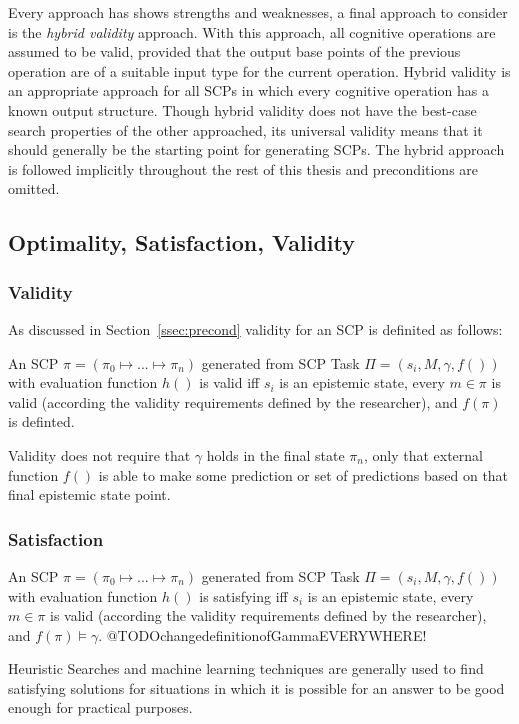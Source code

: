 Every approach has shows strengths and weaknesses, a final approach to consider is the \textit{hybrid validity} approach. With this approach, all cognitive operations are assumed to be valid, provided that the output base points of the previous operation are of a suitable input type for the current operation. Hybrid validity is an appropriate approach for all SCPs in which every cognitive operation has a known output structure. Though hybrid validity does not have the best-case search properties of the other approached, its universal validity means that it should generally be the starting point for generating SCPs. The hybrid approach is followed implicitly throughout the rest of this thesis and preconditions are omitted.

\subsection{Optimality, Satisfaction, Validity} \label{ssec:validity}
\subsubsection{Validity}
As discussed in Section~\ref{ssec:precond} validity for an SCP is definited as follows:

An SCP $\pi=(\pi_0 \longmapsto ... \longmapsto \pi_n)$ generated from SCP Task $\Pi=(s_i, M, \gamma, f())$ with evaluation function $h()$ is valid iff $s_i$ is an epistemic state, every $m \in \pi$ is valid (according the validity requirements defined by the researcher), and $f(\pi)$ is definted. 

Validity does not require that $\gamma$ holds in the final state $\pi_n$, only that external function $f()$ is able to make some prediction or set of predictions based on that final epistemic state point.


\subsubsection{Satisfaction} 

An SCP $\pi=(\pi_0 \longmapsto ... \longmapsto \pi_n)$ generated from SCP Task $\Pi=(s_i, M, \gamma, f())$ with evaluation function $h()$ is satisfying iff $s_i$ is an epistemic state, every $m \in \pi$ is valid (according the validity requirements defined by the researcher), and $f(\pi)\models \gamma$. @TODOchangedefinitionofGammaEVERYWHERE!

Heuristic Searches and machine learning techniques are generally used to find satisfying solutions for situations in which it is possible for an answer to be good enough for practical purposes. 


